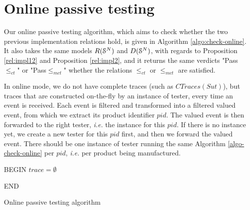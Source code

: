 \section{Online passive testing}
\label{sec:testing:online}

Our online passive testing algorithm, which aims to check whether
the two previous implementation relations hold, is given in
Algorithm \ref{algo:check-online}. It also takes the same models
$R(\EuScript{S}^{N})$ and $D(\EuScript{S}^{N})$, with regards to
Proposition \ref{rel:impl12} and Proposition \ref{rel:impl2}, and
it returns the same verdicts "Pass$\leq_{ct}$" or
"Pass$\leq_{mct}$" whether the relations $\leq_{ct}$ or
$\leq_{mct}$ are satisfied.

In online mode, we do not have complete traces (such as
$CTraces({Sut})$), but traces that are constructed on-the-fly by
an instance of tester, every time an event is received. Each
event is filtered and transformed into a filtered valued event,
from which we extract its product identifier $pid$. The valued
event is then forwarded to the right tester, \emph{i.e.} the
instance for this $pid$. If there is no instance yet, we create a
new tester for this $pid$ first, and then we forward the valued
event. There should be one instance of tester running the same
Algorithm \ref{algo-check-online} per $pid$, \emph{i.e.} per
product being manufactured.



\begin{algorithm}[h]


    BEGIN\;
    $trace = \emptyset$\;


    END\;

    \caption{Online passive testing algorithm}
    \label{algo:check-online}
\end{algorithm}
